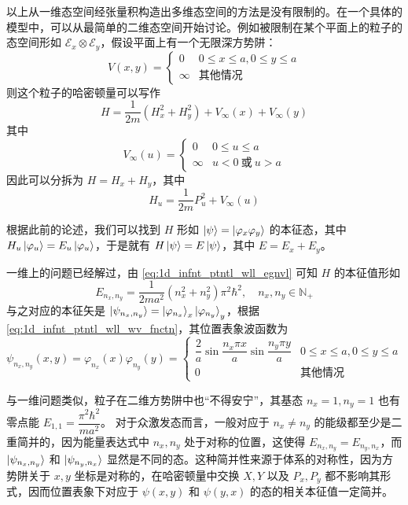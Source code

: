 \documentclass[cn,10pt,math=newtx,citestyle=gb7714-2015,bibstyle=gb7714-2015]{elegantbook}
\def\ms{\mathscr}
\def\N{\mathbb N}
\def\vphi{\varphi}
\def\ox{\otimes}
\begin{document}
以上从一维态空间经张量积构造出多维态空间的方法是没有限制的。在一个具体的模型中，可以从最简单的二维态空间开始讨论。例如被限制在某个平面上的粒子的态空间形如 $\ms E_x\ox\ms E_y$，假设平面上有一个无限深方势阱：
\begin{equation}
    V(x,y) = \begin{cases}
        0 & 0\le x \le a, 0\le y\le a\\
        \infty & \text{其他情况}
    \end{cases}
\end{equation}
则这个粒子的哈密顿量可以写作
\begin{equation}
    H = \frac 1 {2m}\left(H_x^2+H_y^2\right)+V_\infty(x)+V_\infty(y)
\end{equation}
其中
\begin{equation}
    V_\infty(u)=\begin{cases}
        0 & 0\le u\le a\\
        \infty & u< 0\ \text{或}\ u>a
    \end{cases}
\end{equation}
因此可以分拆为 $H = H_x+H_y$，其中
\begin{equation}
    H_u = \frac{1}{2m}P_u^2+V_\infty(u)
\end{equation}

根据此前的论述，我们可以找到 $H$ 形如 $\ket{\psi} = \ket{\vphi_x\vphi_y}$ 的本征态，其中 $H_u\ket{\vphi_u} = E_u\ket{\vphi_u}$，于是就有 $H\ket{\psi} = E\ket{\psi}$，其中 $E = E_x+E_y$。

一维上的问题已经解过，由 \ref{eq:1d_infnt_ptntl_wll_egnvl} 可知 $H$ 的本征值形如
\begin{equation}
    E_{n_x,n_y} = \frac{1}{2ma^2}(n_x^2+n_y^2)\pi^2\hbar^2,\quad n_x,n_y\in\N_+
\end{equation}
与之对应的本征矢是 $\ket{\psi_{n_x,n_y}} = \ket{\vphi_{n_x}}_x\ket{\vphi_{n_y}}_y$，根据 \ref{eq:1d_infnt_ptntl_wll_wv_fnctn}，其位置表象波函数为
\begin{equation}
    \psi_{n_x,n_y}(x,y) = \vphi_{n_x}(x)\vphi_{n_y}(y) = 
    \begin{cases}
        \dfrac 2 a\sin\dfrac{n_x\pi x}a\sin\dfrac{n_y\pi y}a & 0\le x\le a,0\le y\le a\\
        0 & \text{其他情况}
    \end{cases}
\end{equation}

与一维问题类似，粒子在二维方势阱中也“不得安宁”，其基态 $n_x=1,n_y=1$ 也有零点能
    $E_{1,1} = \dfrac{\pi^2\hbar^2}{ma^2}$。
对于众激发态而言，一般对应于 $n_x\ne n_y$ 的能级都至少是二重简并的，因为能量表达式中 $n_x,n_y$ 处于对称的位置，这使得 $E_{n_x,n_y} = E_{n_y,n_x}$，而 $\ket{\psi_{n_x,n_y}}$ 和 $\ket{\psi_{n_y,n_x}}$ 显然是不同的态。这种简并性来源于体系的对称性，因为方势阱关于 $x,y$ 坐标是对称的，在哈密顿量中交换 $X,Y$ 以及 $P_x,P_y$ 都不影响其形式，因而位置表象下对应于 $\psi(x,y)$ 和 $\psi(y,x)$ 的态的相关本征值一定简并。
\end{document}
